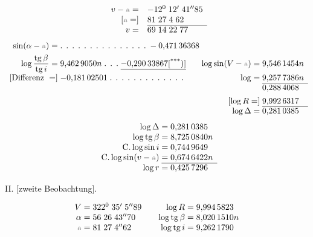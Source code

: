 \begingroup\renewcommand{\thefootnote}{}\endgroup
\[
\begin{array}{r@{\quad}l}
v-\AstNode=&-12^0\;12'\;41''85\\
{}[\AstNode=]&81\;27\;4\;62\\\cline{2-2}
v=&69\;14\;22\;77
\end{array}
\]
\begingroup\small\setlength{\arraycolsep}{1pt}
\[
\begin{array}{r@{\;}l@{\;}r@{\;}l}
\sin(\alpha-\AstNode)=&\text{. . . . . . . . . . . . . . .}\;-0{,}471\,36368&&\\[1ex]
\log\dfrac{\operatorname{tg}\beta}{\operatorname{tg}i}=&9{,}462\,9050n\;\text{. . .}\;\underline{-0{,}290\,33867\text{[\textsuperscript{***})]}}&\log\sin(V-\AstNode)=&9{,}546\,1454n\\
\text{[Differenz }=]&-0{,}181\,02501\;\text{. . . . . . . . . . . . .}&\log=&9{,}257\,7386n\\\cline{4-4}
&&&0{,}288\,4068\\[1ex]
&&[\log R=]&9{,}992\,6317\\\cline{4-4}
&&\log\Delta=&0{,}281\,0385
\end{array}
\]
\endgroup
\begingroup\renewcommand{\thefootnote}{}\endgroup
\clearpage
{}
\[
\begin{array}{r@{\;}c@{\;}l}
\log\Delta&=&0{,}281\,0385\\
\log\operatorname{tg}\beta&=&8{,}725\,0840n\\
\mathrm{C.}\log\sin i&=&0{,}744\,9649\\
\mathrm{C.}\log\sin(v-\AstNode)&=&0{,}674\,6422n\\\cline{2-3}
\log r&=&0{,}425\,7296
\end{array}
\]
\begin{center}II. [zweite Beobachtung].\end{center}
\noindent{\small [S. 7]}\par
\[
\begin{array}{r@{\;}c@{\;}l@{\qquad}r@{\;}c@{\;}l}
V&=&322^0\;35'\;5''89&\log R&=&9{,}994\,5823\\
\alpha&=&56\;26\;43''70&\log\operatorname{tg}\beta&=&8{,}020\,1510n\\
\AstNode&=&81\;27\;4''62&\log\operatorname{tg}i&=&9{,}262\,1790
\end{array}
\]
